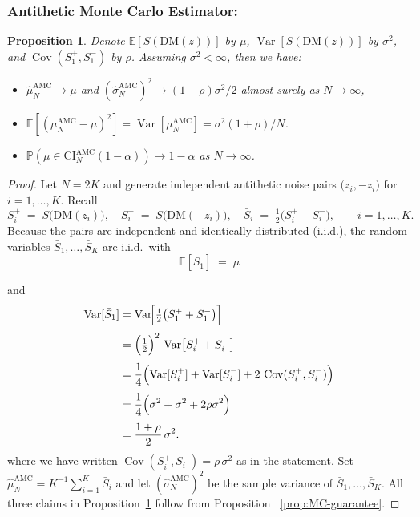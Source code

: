 \documentclass[12pt]{article}
\newcommand{\0}{\mathbf{0}}
\newcommand{\bE}{\mathbb{E}}
\newcommand{\bP}{\mathbb{P}}
\newcommand{\DM}{\text{DM}}
\newcommand{\CI}{\text{CI}}
\newcommand{\AMC}{\text{AMC}}
\DeclareMathOperator{\Cov}{Cov}
\DeclareMathOperator{\Var}{Var}
\newtheorem{prop}{Proposition}
\begin{document}
\subsubsection{Antithetic Monte Carlo Estimator:}
\begin{prop}\label{prop:AMC-guarantee}
    Denote $\bE[S(\DM(z))]$ by $\mu$, $\Var[S(\DM(z))]$ by $\sigma^2$, and $\Cov(S_1^+, S_1^-)$ by $\rho$. Assuming $\sigma^2 < \infty$, then we have:
    \begin{itemize}
        \item $\hat \mu_N^\AMC \rightarrow \mu$ and $(\hat\sigma_N^\AMC)^2 \rightarrow (1+\rho)\sigma^2/2$ almost surely as $N \rightarrow \infty$, 
        \item $\bE[(\mu_N^\AMC - \mu)^2] = \Var[\mu_N^\AMC] = \sigma^2(1+\rho)/N$. 
        \item $\bP\left(\mu \in \CI^\AMC_N(1-\alpha)\right) \rightarrow 1-\alpha$ as $N\rightarrow \infty$.
    \end{itemize}
\end{prop}

\begin{proof}\label{proof: proof AMC-guarantee}
Let $N=2K$ and generate independent antithetic noise pairs
$\bigl(z_i,-z_i\bigr)$ for $i=1,\dots,K$.  
Recall
\[
S_i^+ \;=\; S\!\bigl(\DM(z_i)\bigr),
\quad
S_i^- \;=\; S\!\bigl(\DM(-z_i)\bigr),
\quad
\bar S_i \;=\;\tfrac12\bigl(S_i^+ + S_i^-\bigr),
\qquad
i=1,\dots,K .
\]
Because the pairs are independent and identically distributed (i.i.d.),
the random variables $\bar S_1,\dots,\bar S_K$ are i.i.d.\ with
\[
\bE[\bar S_1] \;=\; \mu\]

and
\begin{align}
\Var[\bar S_1]
&=\Var\!\Bigl[\tfrac12\bigl(S_1^{+}+S_1^{-}\bigr)\Bigr] \\[3pt]
&=\Bigl(\tfrac12\Bigr)^{2}\,
  \Var\!\left[S_i^{+}+S_i^{-}\right] \\[3pt]
&=\frac14\Bigl(
     \Var[S_i^{+}]
     +\Var[S_i^{-}]
     +2\,\Cov(S_i^{+},S_i^{-})
   \Bigr) \\[3pt]
&=\frac14\Bigl(
     \sigma^{2}
     +\sigma^{2}
     +2\rho\sigma^{2}
   \Bigr) \\[3pt]
&=\frac{1+\rho}{2}\,\sigma^{2}.
\end{align}
where we have written $\Cov(S_i^+,S_i^-)=\rho\,\sigma^{2}$ as in the statement.
Set 
\(
\hat\mu_N^\AMC = K^{-1}\sum_{i=1}^{K}\bar S_i
\)
and let $(\hat\sigma_N^\AMC)^2$ be the sample variance of $\bar S_1,\dots,\bar S_K$. All three claims in Proposition~\ref{prop:AMC-guarantee} follow from Proposition ~\ref{prop:MC-guarantee}.

\end{proof}
\end{document}
